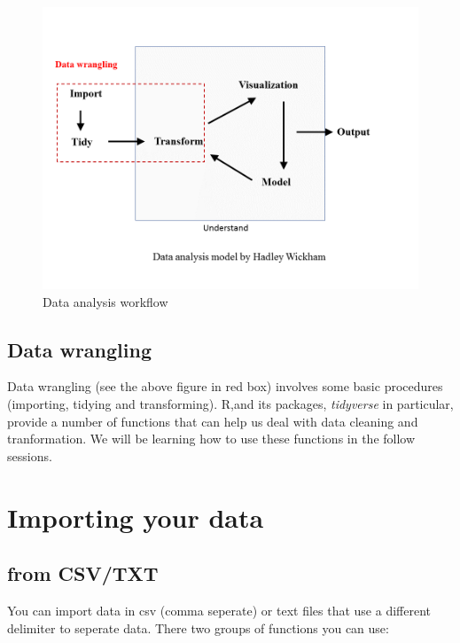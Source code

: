 \documentclass[]{book}
\begin{document}
\begin{figure}

{\centering \includegraphics[width=1\linewidth]{img/DA_workflow} 

}

\caption{Data analysis workflow}\label{fig:figure2}
\end{figure}

\section{Data wrangling}\label{data-wrangling}

Data wrangling (see the above figure in red box) involves some basic
procedures (importing, tidying and transforming). R,and its packages,
\emph{tidyverse} in particular, provide a number of functions that can
help us deal with data cleaning and tranformation. We will be learning
how to use these functions in the follow sessions.

\chapter{Importing your data}\label{importing-your-data}

\section{from CSV/TXT}\label{from-csvtxt}

You can import data in csv (comma seperate) or text files that use a
different delimiter to seperate data. There two groups of functions you
can use:
\end{document}

